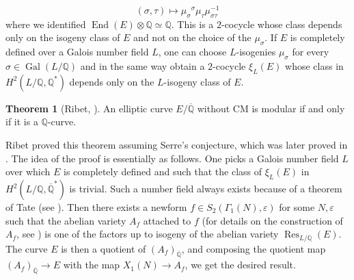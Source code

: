 \documentclass[11pt]{amsart}
\theoremstyle{definition}
\newtheorem{thm}[definizione]{Theorem}
\begin{document}
		$$(\sigma,\tau)\mapsto \mu_{\sigma}{{}^\sigma\!}\mu_{\tau}\mu_{\sigma\tau}^{-1}$$
		where we identified $\operatorname{End}(E)\otimes {\mathbb{Q}}\simeq{\mathbb{Q}}$. This is a $2$-cocycle whose class depends only on the isogeny class of $E$ and not on the choice of the $\mu_{\sigma}$. If $E$ is completely defined over a Galois number field $L$, one can choose $L$-isogenies $\mu_{\sigma}$ for every $\sigma \in \operatorname{Gal}(L/{\mathbb{Q}})$ and in the same way obtain a $2$-cocycle $\xi_L(E)$ whose class in $H^2(L/{\mathbb{Q}},{\mathbb{Q}}^*)$ depends only on the $L$-isogeny class of $E$.
		\begin{thm}[Ribet, \cite{rib1}]
                \label{Qcurvesaremodular}
				An elliptic curve $E/{\overline{\mathbb{Q}}}$ without CM is modular if and only if it is a ${\mathbb{Q}}$-curve.
		\end{thm}
		Ribet proved this theorem assuming Serre's conjecture, which was later proved in \cite{kwin}. The idea of the proof is essentially as follows. One picks a Galois number field $L$ over which $E$ is completely defined and such that the class of $\xi_L(E)$ in $H^2(L/{\mathbb{Q}},{\overline{\mathbb{Q}}}^*)$ is trivial. Such a number field always exists because of a theorem of Tate (see \cite[Theorem 4]{ser}). Then there exists a newform $f\in S_2(\Gamma_1(N),\varepsilon)$ for some $N,\varepsilon$ such that the abelian variety $A_f$ attached to $f$ (for details on the construction of $A_f$, see \cite{shi1}) is one of the factors up to isogeny of the abelian variety $\operatorname{Res}_{L/{\mathbb{Q}}}(E)$. The curve $E$ is then a quotient of $(A_f)_{\overline{\mathbb{Q}}}$, and composing the quotient map $(A_f)_{\overline{\mathbb{Q}}}\to E$ with the map $X_1(N)\to A_f$, we get the desired result.
\end{document}
